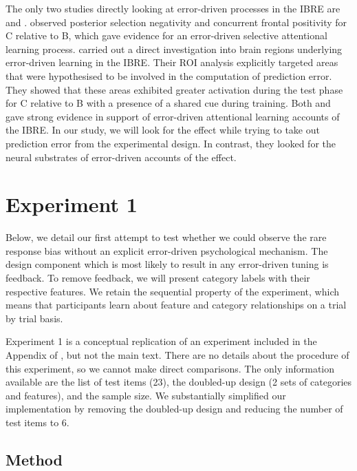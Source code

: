 \documentclass[10pt,letterpaper]{article}
\begin{document}
The only two studies directly looking at error-driven processes in the IBRE are  and .
 observed posterior selection negativity and concurrent frontal positivity for C relative to B, which gave evidence for an error-driven selective attentional learning process.
 carried out a direct investigation into brain regions underlying error-driven learning in the IBRE.
Their ROI analysis explicitly targeted areas that were hypothesised to be involved in the computation of prediction error.
They showed that these areas exhibited greater activation during the test phase for C relative to B with a presence of a shared cue during training.
Both  and  gave strong evidence in support of error-driven attentional learning accounts of the IBRE.
In our study, we will look for the effect while trying to take out prediction error from the experimental design.
In contrast, they looked for the neural substrates of error-driven accounts of the effect.

\section{Experiment 1}

Below, we detail our first attempt to test whether we could observe the rare response bias without an explicit error-driven psychological mechanism.
The design component which is most likely to result in any error-driven tuning is feedback.
To remove feedback, we will present category labels with their respective features.
We retain the sequential property of the experiment, which means that participants learn about feature and category relationships on a trial by trial basis.

Experiment 1 is a conceptual replication of an experiment included in the Appendix of , but not the main text.
There are no details about the procedure of this experiment, so we cannot make direct comparisons.
The only information available are the list of test items (23), the doubled-up design (2 sets of categories and features), and the sample size.
We substantially simplified our implementation by removing the doubled-up design and reducing the number of test items to 6.

\subsection{Method}
\end{document}
